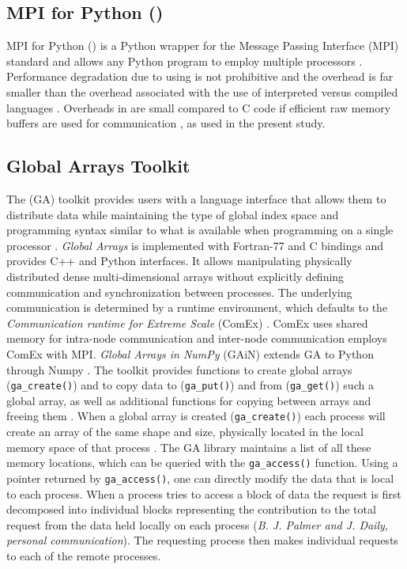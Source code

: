 \subsection{MPI for Python ()}
\label{sec:methods-mpi4py}

MPI for Python () is a Python wrapper for the Message Passing Interface (MPI) standard and allows any Python program to employ multiple processors \cite{Dalcin:2011aa, Dalcin:2005aa}.
Performance degradation due to using  is not prohibitive \cite{Dalcin:2011aa, Dalcin:2005aa} and the overhead is far smaller than the overhead associated with the use of interpreted versus compiled languages \cite{GAiN}.
Overheads in  are small compared to C code if efficient raw memory buffers are used for communication \cite{Dalcin:2011aa}, as used in the present study.

\subsection{Global Arrays Toolkit}
\label{sec:methods-ga}

The  (GA) toolkit provides users with a language interface that allows them to distribute data while maintaining the type of global index space and programming syntax similar to what is available when programming on a single processor \cite{GA}.
\emph{Global Arrays} is implemented with Fortran-77 and C bindings and provides C++ and Python interfaces.
It allows manipulating physically distributed dense multi-dimensional arrays without explicitly defining communication and synchronization between processes.
The underlying communication is determined by a runtime environment, which defaults to the \emph{Communication runtime for Extreme Scale} (ComEx) \cite{Daily:2014aa}.
ComEx uses shared memory for intra-node communication and inter-node communication employs ComEx with MPI.
\emph{Global Arrays in NumPy} (GAiN) extends GA to Python through Numpy \cite{GAiN}. 
The  toolkit provides functions to create global arrays (\texttt{ga\_create()}) and to copy data to (\texttt{ga\_put()}) and from (\texttt{ga\_get()}) such a global array,  as well as additional functions for copying between arrays and freeing them \cite{GAiN}.
When a global array is created (\texttt{ga\_create()}) each process will create an array of the same shape and size, physically located in the local memory space of that process \cite{GA}. 
The GA library maintains a list of all these memory locations, which can be queried with the \texttt{ga\_access()} function.
Using a pointer returned by \texttt{ga\_access()}, one can directly modify the data that is local to each process.
When a process tries to access a block of data the request is first decomposed into individual blocks representing the contribution to the total request from the data held locally on each process (\textit{B. J. Palmer and J. Daily, personal communication}).
The requesting process then makes individual requests to each of the remote processes. 

